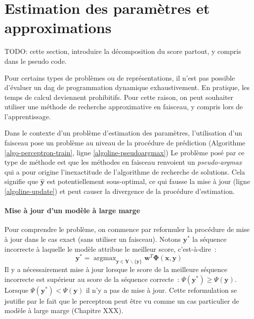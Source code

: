 \documentclass[11pt,openany]{book}
\newcommand{\ac}[1]{{\sc #1}} %
\begin{document}
\section{Estimation des paramètres et approximations}

TODO: cette section, introduire la décomposition du score partout, y
compris dans le pseudo code.

Pour certains types de problèmes ou de représentations, il n'est pas
possible d'évaluer un \ac{dag} de programmation dynamique exhaustivement.
En pratique, les temps de calcul deviennent prohibitifs.
Pour cette raison, on peut souhaiter utiliser une méthode de recherche
approximative en faisceau, y compris lors de l'apprentissage.

Dans le contexte d'un problème d'estimation des paramètres,
l'utilisation d'un faisceau pose un problème au niveau de la procédure
de prédiction (Algorithme  \ref{algo-perceptron-train}, ligne \ref{algoline-pseudoargmax})
Le problème posé par ce type de méthode est que les méthodes en
faisceau renvoient un {\sl pseudo-argmax} qui a pour origine
l'inexactitude de l'algorithme de recherche de solutions.
Cela signifie que $\hat{\mathbf{y}}$ est potentiellement sous-optimal,
ce qui fausse la mise à jour (ligne \ref{algoline-update}) et peut
causer la divergence de la procédure d'estimation.

\paragraph{Mise à jour d'un modèle à large marge}
Pour comprendre le problème, on commence par reformuler la procédure 
de mise à jour dans le cas exact (sans utiliser un faisceau). Notons  $\mathbf{y}^*$ la séquence
incorrecte à laquelle le modèle attribue le meilleur score, c'est-à-dire~:
\begin{displaymath}
\mathbf{y}^* = \mathop{\text{argmax}}_{\mathbf{y} \in
  \mathbf{Y}\backslash \{\mathbf{y}\}} \mathbf{w}^T \boldsymbol\Phi(\mathbf{x},\mathbf{y})
\end{displaymath}
Il y a nécessairement mise à jour lorsque le score de la meilleure séquence
incorrecte est supérieur au score de la séquence correcte~: $\Psi(\mathbf{y}^*) \geq \Psi(\mathbf{y})$.
Lorsque $\Psi(\mathbf{y}^*) <\Psi(\mathbf{y})$ il n'y a pas de mise à
jour. Cette reformulation se jsutifie par le fait que le perceptron
peut être vu comme un cas particulier de modèle à large marge
(Chapitre XXX). 
\end{document}
